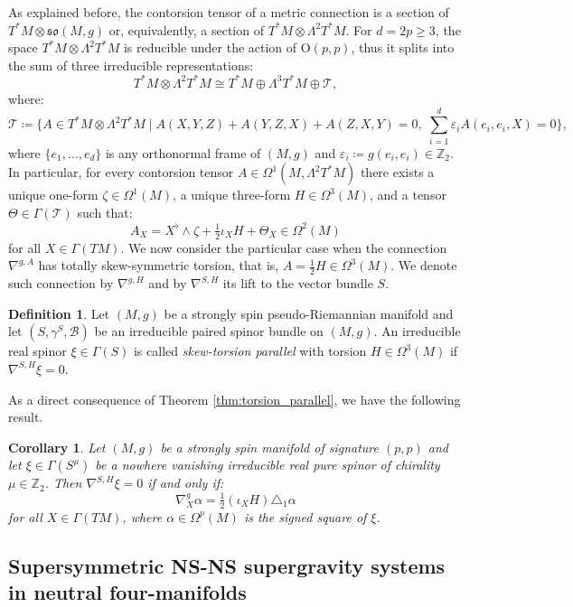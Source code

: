 \documentclass[10pt,reqno]{amsart}
\newtheorem{corollary}[theorem]{Corollary}
\theoremstyle{definition}
\newtheorem{definition}[theorem]{Definition}
\theoremstyle{remark}
\newcommand{\Z}{\mathbb{Z}}
\begin{document}
As explained before, the contorsion tensor of a metric connection is a section of $T^*M\otimes\mathfrak{so}(M,g)$ or, equivalently, a section of $T^*M\otimes\Lambda^2T^*M$. For $d=2p\geq3$, the space $T^*M\otimes\Lambda^2T^*M$ is reducible under the action of $\mathrm{O}(p,p)$, thus it splits into the sum of three irreducible representations: $$T^*M\otimes\Lambda^2T^*M\cong T^*M\oplus\Lambda^3T^*M\oplus\mathcal{T},$$ where: $$\mathcal{T}\coloneqq\{A\in T^*M\otimes\Lambda^2T^*M\mid A(X,Y,Z)+A(Y,Z,X)+A(Z,X,Y)=0,\;\sum_{i=1}^d\varepsilon_iA(e_i,e_i,X)=0\},$$ where $\{e_1,\ldots,e_d\}$ is any orthonormal frame of $(M,g)$ and $\varepsilon_i\coloneqq g(e_i,e_i)\in\Z_2$. In particular, for every contorsion tensor $A\in\Omega^1(M,\Lambda^2T^*M)$ there exists a unique one-form $\zeta\in\Omega^1(M)$, a unique three-form $H\in\Omega^3(M)$, and a tensor $\Theta\in\Gamma(\mathcal{T})$ such that: $$A_X=X^\flat\wedge\zeta+\tfrac{1}{2}\iota_XH+\Theta_X\in\Omega^2(M)$$ for all $X\in\Gamma(TM)$. We now consider the particular case when the connection $\nabla^{g,A}$ has totally skew-symmetric torsion, that is, $A=\frac{1}{2}H\in\Omega^3(M)$. We denote such connection by $\nabla^{g,H}$ and by $\nabla^{S,H}$ its lift to the vector bundle $S$.

\begin{definition}
    Let $(M,g)$ be a strongly spin pseudo-Riemannian manifold and let $(S,\gamma^S,\mathscr{B})$ be an irreducible paired spinor bundle on $(M,g)$. An irreducible real spinor $\xi\in\Gamma(S)$ is called \emph{skew-torsion parallel} with torsion $H\in\Omega^3(M)$ if $\nabla^{S,H}\xi=0$.
\end{definition}

As a direct consequence of Theorem \ref{thm:torsion_parallel}, we have the following result.

\begin{corollary}\label{cor:skew_torsion_(p,p)}
    Let $(M,g)$ be a strongly spin manifold of signature $(p,p)$ and let $\xi\in\Gamma(S^\mu)$ be a nowhere vanishing irreducible real pure spinor of chirality $\mu\in\Z_2$. Then $\nabla^{S,H}\xi=0$ if and only if: $$\nabla^g_X\alpha=\tfrac{1}{2}(\iota_XH)\triangle_1\alpha$$ for all $X\in\Gamma(TM)$, where $\alpha\in\Omega^p(M)$ is the signed square of $\xi$.
\end{corollary}

\subsection{Supersymmetric NS-NS supergravity systems in neutral four-manifolds}
\end{document}
